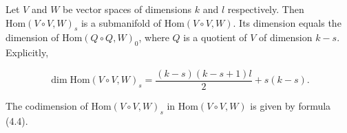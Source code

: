 Let $V$ and $W$ be vector spaces of dimensions $k$ and $l$ respectively. Then $\text{Hom}(V \circ V, W)_s$ is a submanifold of $\text{Hom}(V \circ V, W)$. Its dimension equals the dimension of $\text{Hom}(Q \circ Q, W)_0$, where $Q$ is a quotient of $V$ of dimension $k - s$. Explicitly,

$$\dim \text{Hom}(V \circ V, W)_s = \frac{(k-s)(k-s+1)l}{2} + s(k-s).$$

The codimension of $\text{Hom}(V \circ V, W)_s$ in $\text{Hom}(V \circ V, W)$ is given by formula (4.4).
